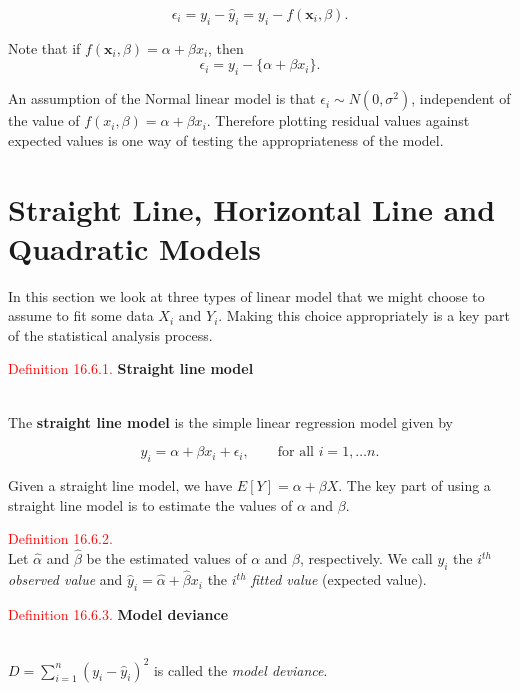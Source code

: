 \documentclass[
]{book}
\begin{document}
\[ \epsilon_i = y_i - \hat{y}_i = y_i - f (\mathbf{x}_i,\beta). \]

Note that if \(f(\mathbf{x}_i, \beta) = \alpha + \beta x_i\), then\\

\[ \epsilon_i = y_i - \{ \alpha + \beta x_i \}. \]

An assumption of the Normal linear model is that \(\epsilon_i \sim N(0,\sigma^2)\), independent of the value of \(f(x_i, \beta) = \alpha +\beta x_i\). Therefore plotting residual values against expected values is one way of testing the appropriateness of the model.

\hypertarget{Sec_LinearI:line}{%
\section{Straight Line, Horizontal Line and Quadratic Models}\label{Sec_LinearI:line}}

In this section we look at three types of linear model that we might choose to assume to fit some data \(X_i\) and \(Y_i\). Making this choice appropriately is a key part of the statistical analysis process.

\leavevmode{}%
\textcolor{red}{Definition 16.6.1.}
{\textbf{Straight line model}}\\
\strut \\
The \textbf{straight line model} is the simple linear regression model given by

\[y_{i} = \alpha + \beta x_i + \epsilon_i, \qquad \text{for all  } i =1,\ldots n.\]

Given a straight line model, we have \(E[Y] = \alpha + \beta X\). The key part of using a straight line model is to estimate the values of \(\alpha\) and \(\beta\).

\leavevmode{}%
\textcolor{red}{Definition 16.6.2.}\\
Let \(\hat{\alpha}\) and \(\hat{\beta}\) be the estimated values of \(\alpha\) and \(\beta\), respectively. We call \(y_i\) the \(i^{th}\) \emph{observed value} and \(\hat{y}_i = \hat{\alpha} + \hat{\beta} x_i\) the \(i^{th}\) \emph{fitted value} (expected value).

\leavevmode{}%
\textcolor{red}{Definition 16.6.3.}
{\textbf{Model deviance}}\\
\strut \\
\(D = \sum_{i=1}^{n} \left(y_{i}-\hat{y}_i\right)^{2}\) is called the \emph{model deviance}.
\end{document}
